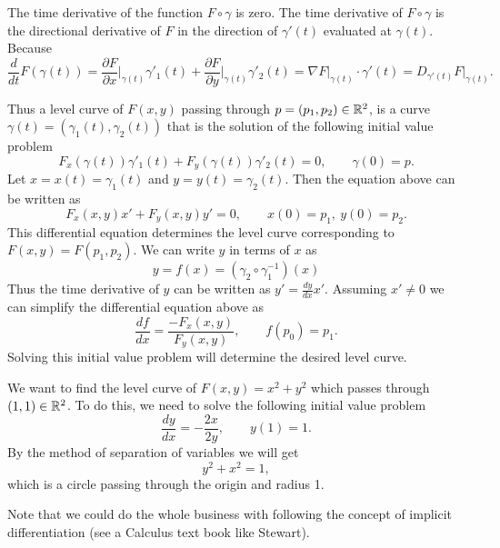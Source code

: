 \newpage
The time derivative of the function $F\circ\gamma$ is zero. The time derivative of $F\circ\gamma$ is the directional derivative of $F$ in the direction of $\gamma'(t)$ evaluated at $\gamma(t)$. Because
\[ \frac{d}{dt} F(\gamma(t)) =  \frac{\partial F}{\partial x}\big|_{\gamma(t)} \gamma'_1(t) + \frac{\partial F}{\partial y}\big|_{\gamma(t)} \gamma'_2(t) = \nabla F \big|_{\gamma(t)} \cdot \gamma'(t) = D_{\gamma'(t)} F \big|_{\gamma(t)}.\]

Thus a level curve of $F(x,y)$ passing through $p = (p_1, p_2)\in\mathbb{R}^2$, is a curve $\gamma(t) = (\gamma_1(t),\gamma_2(t))$ that is the solution of the following initial value problem
\[ F_x (\gamma(t)) \gamma'_1(t) + F_y(\gamma(t)) \gamma'_2(t) =0, \qquad \gamma(0) = p.\]
Let $x = x(t) = \gamma_1(t)$ and $y = y(t) = \gamma_2(t)$. Then the equation above can be written as
\[ F_x(x,y) x' + F_y(x,y) y' = 0, \qquad x(0)=p_1,\ y(0)=p_2.\]
This differential equation determines the level curve corresponding to $F(x,y)=F(p_1,p_2)$. We can write $y$ in terms of $x$ as 
\[ y = f(x) = (\gamma_2 \circ \gamma_1^{-1}) (x) \]
Thus the time derivative of $y$ can be written as $y' = \frac{d y}{dx} x'$. Assuming $x' \neq 0$ we can simplify the differential equation above as
\[ \frac{df}{dx} = \frac{- F_x(x,y)}{F_y(x,y)},\qquad f(p_0) = p_1. \]
Solving this initial value problem will determine the desired level curve. 

\begin{example}
	We want to find the level curve of $F(x,y) = x^2 + y^2$ which passes through $(1,1)\in\mathbb{R}^2$. To do this, we need to solve the following initial value problem
	\[ \frac{dy}{dx} = -\frac{2x}{2y}, \qquad y(1) = 1. \]
	By the method of separation of variables we will get
	\[ y^2 + x^2 = 1, \]
	which is a circle passing through the origin and radius 1. 
\end{example}

Note that we could do the whole business with following the concept of implicit differentiation (see a Calculus text book like Stewart).

